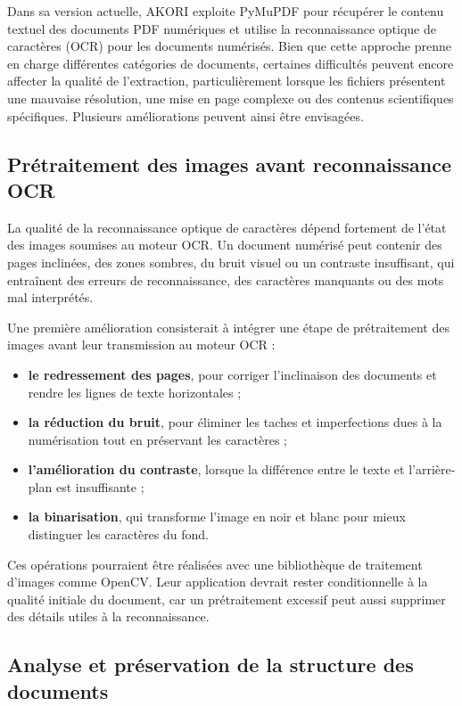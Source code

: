 \documentclass[12pt,a4paper,oneside]{report}
\begin{document}
Dans sa version actuelle, AKORI exploite PyMuPDF pour récupérer le contenu textuel des documents PDF numériques et utilise la reconnaissance optique de caractères (OCR) pour les documents numérisés. Bien que cette approche prenne en charge différentes catégories de documents, certaines difficultés peuvent encore affecter la qualité de l'extraction, particulièrement lorsque les fichiers présentent une mauvaise résolution, une mise en page complexe ou des contenus scientifiques spécifiques. Plusieurs améliorations peuvent ainsi être envisagées.

\subsection{Prétraitement des images avant reconnaissance OCR}

La qualité de la reconnaissance optique de caractères dépend fortement de l'état des images soumises au moteur OCR. Un document numérisé peut contenir des pages inclinées, des zones sombres, du bruit visuel ou un contraste insuffisant, qui entraînent des erreurs de reconnaissance, des caractères manquants ou des mots mal interprétés.

Une première amélioration consisterait à intégrer une étape de prétraitement des images avant leur transmission au moteur OCR :
\begin{itemize}
  \item \textbf{le redressement des pages}, pour corriger l'inclinaison des documents et rendre les lignes de texte horizontales ;
  \item \textbf{la réduction du bruit}, pour éliminer les taches et imperfections dues à la numérisation tout en préservant les caractères ;
  \item \textbf{l'amélioration du contraste}, lorsque la différence entre le texte et l'arrière-plan est insuffisante ;
  \item \textbf{la binarisation}, qui transforme l'image en noir et blanc pour mieux distinguer les caractères du fond.
\end{itemize}

Ces opérations pourraient être réalisées avec une bibliothèque de traitement d'images comme OpenCV. Leur application devrait rester conditionnelle à la qualité initiale du document, car un prétraitement excessif peut aussi supprimer des détails utiles à la reconnaissance.

\subsection{Analyse et préservation de la structure des documents}
\end{document}
